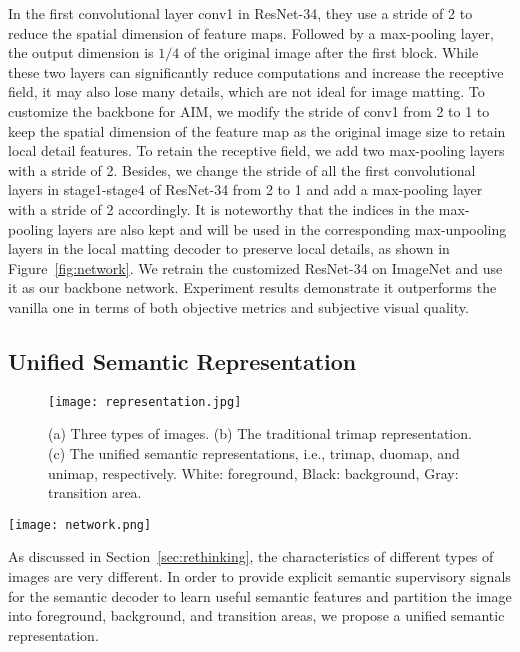 \documentclass{article}
\begin{document}
In the first convolutional layer conv1 in ResNet-34, they use a stride of 2 to reduce the spatial dimension of feature maps. Followed by a max-pooling layer, the output dimension is $1/4$ of the original image after the first block. While these two layers can significantly reduce computations and increase the receptive field, it may also lose many details, which are not ideal for image matting. To customize the backbone for AIM, we modify the stride of conv1 from 2 to 1 to keep the spatial dimension of the feature map as the original image size to retain local detail features. To retain the receptive field, we add two max-pooling layers with a stride of 2. Besides, we change the stride of all the first convolutional layers in stage1-stage4 of ResNet-34 from 2 to 1 and add a max-pooling layer with a stride of 2 accordingly. It is noteworthy that the indices in the max-pooling layers are also kept and will be used in the corresponding max-unpooling layers in the local matting decoder to preserve local details, as shown in Figure~\ref{fig:network}. We retrain the customized ResNet-34 on ImageNet and use it as our backbone network. Experiment results demonstrate it outperforms the vanilla one in terms of both objective metrics and subjective visual quality. 

\subsection{Unified Semantic Representation}

\begin{figure}[hbt!]
    \texttt{[image: representation.jpg]}
    \caption{(a) Three types of images. (b) The traditional trimap representation. (c) The unified semantic representations, i.e., trimap, duomap, and unimap, respectively. White: foreground, Black: background, Gray: transition area.}
    \label{fig:featuremap}
\end{figure}

\begin{figure*}[t]

    \texttt{[image: network.png]}
    \caption{The structure of our matting network for AIM.}
    \label{fig:network}
\end{figure*}
As discussed in Section~\ref{sec:rethinking}, the characteristics of different types of images are very different. In order to provide explicit semantic supervisory signals for the semantic decoder to learn useful semantic features and partition the image into foreground, background, and transition areas, we propose a unified semantic representation. 
\end{document}

